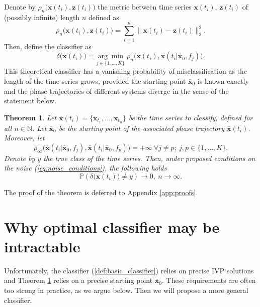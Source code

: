 \documentclass[referee, pdflatex, sn-mathphys-num]{sn-jnl}
\theoremstyle{definition}
\theoremstyle{plain}
\newtheorem{Th}{Theorem}
\newcommand{\bz}{\ensuremath{\mathbf{z}}}
\newcommand{\bx}{\ensuremath{\mathbf{x}}}
\newcommand{\bbx}{\ensuremath{\bar{\mathbf{x}}}}
\begin{document}
	Denote by $\rho_n\big( \bx(t_i), \bz(t_i) \big)$ the metric between time series $\bx(t_i)$, $\bz(t_i)$ of (possibly infinite) length $n$ defined as
	\begin{equation}\label{def:series_distance}
		\rho_n\big( \bx(t_i), \bz(t_i) \big) = \sum\limits_{i=1}^n \lVert \bx(t_i) - \bz(t_i) \rVert_2^2.
	\end{equation}
	Then, define the classifier as
	\begin{equation}\label{def:basic_classifier}
		\delta \big( \bx(t_i) \big) = \underset{j \in \{1, \ldots, K\}}{\arg\min} \ \rho_n\big( \bx(t_i), \bbx(t_i | \bbx_0, f_j) \big).
	\end{equation}
	This theoretical classifier has a vanishing probability of misclassification as the length of the time series grows, provided the starting point $\bbx_0$ is known exactly and the phase trajectories of different systems diverge in the sense of the statement below.
	\begin{Th}\label{thm:asympt_optimal}
		Let $\bx(t_i)= \{\bx_{t_1}, \ldots, \bx_{t_n}\}$ be the time series to classify, defined for all $n \in \mathbb{N}$. Let $\bbx_0$ be the starting point of the associated phase trajectory $\bbx(t_i)$. Moreover, let
		\begin{equation}\label{eq:divergence}
			\rho_{\infty} \big( \bbx(t_i | \bbx_0, f_j), \bbx(t_i | \bbx_0, f_p) \big) = +\infty \ \forall j \not= p; \ j,p \in \{1, \ldots, K\}.
		\end{equation}
		Denote by $y$ the true class of the time series. Then, under proposed conditions on the noise (\ref{eq:noise_conditions}), the following holds
		\begin{equation*}
			\mathbb{P}(\delta \big( \bx(t_i) \big) \not= y)  \to 0, \  n \to \infty.
		\end{equation*}
	\end{Th}
	The proof of the theorem is deferred to Appendix \ref{app:proofs}.
	
	\section{Why optimal classifier may be intractable}\label{sec:cls_problems}
	
	Unfortunately, the classifier (\ref{def:basic_classifier}) relies on precise IVP solutions and Theorem \ref{thm:asympt_optimal} relies on a precise starting point $\bbx_0$. These requirements are often too strong in practice, as we argue below. Then we will propose a more general classifier.
	
\end{document}
